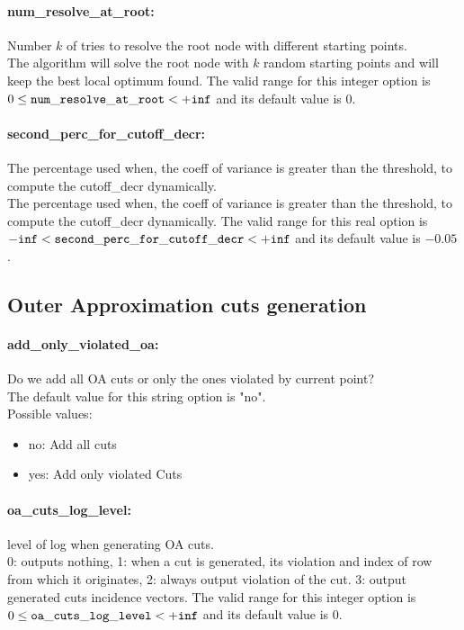 \paragraph{num\_resolve\_at\_root:}\label{sec:num_resolve_at_root} Number $k$ of tries to resolve the root node with different starting points. $\;$ \\
 The algorithm will solve the root node with $k$
random starting points and will keep the best
local optimum found. The valid range for this integer option is
$0 \le {\tt num\_resolve\_at\_root } <  {\tt +inf}$
and its default value is $0$.


\paragraph{second\_perc\_for\_cutoff\_decr:}\label{sec:second_perc_for_cutoff_decr} The percentage used when, the coeff of variance is greater than the threshold, to compute the cutoff\_decr dynamically. $\;$ \\
 The percentage used when, the coeff of variance
is greater than the threshold, to compute the
cutoff\_decr dynamically. The valid range for this real option is 
${\tt -inf} <  {\tt second\_perc\_for\_cutoff\_decr } <  {\tt +inf}$
and its default value is $-0.05$.


\subsection{Outer Approximation cuts generation}
\label{sec:Outer_Approximation_cuts_generation}
\paragraph{add\_only\_violated\_oa:}\label{sec:add_only_violated_oa} Do we add all OA cuts or only the ones violated by current point? $\;$ \\

The default value for this string option is "no".
\\ 
Possible values:
\begin{itemize}
   \item no: Add all cuts
   \item yes: Add only violated Cuts
\end{itemize}

\paragraph{oa\_cuts\_log\_level:}\label{sec:oa_cuts_log_level} level of log when generating OA cuts. $\;$ \\
 0: outputs nothing,
1: when a cut is generated,
its violation and index of row from which it
originates,
2: always output violation of the
cut.
3: output generated cuts incidence vectors. The valid range for this integer option is
$0 \le {\tt oa\_cuts\_log\_level } <  {\tt +inf}$
and its default value is $0$.


